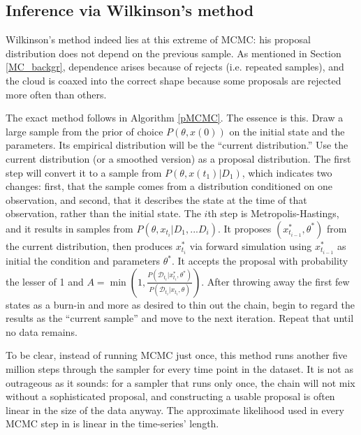 \documentclass{article}
\begin{document}
\subsection{Inference via Wilkinson's method}
Wilkinson's method indeed lies at this extreme of MCMC: his proposal distribution does not depend on the previous sample. As mentioned in Section \ref{MC_backgr}, dependence arises because of rejects (i.e. repeated samples), and the cloud is coaxed into the correct shape because some proposals are rejected more often than others. 

The exact method follows in Algorithm \ref{pMCMC}. The essence is this. Draw a large sample from the prior of choice $P(\theta, x(0))$ on the initial state and the parameters. Its empirical distribution will be the ``current distribution.'' Use the current distribution (or a smoothed version) as a proposal distribution. The first step will convert it to a sample from $P(\theta, x(t_1)|D_1)$, which indicates two changes: first, that the sample comes from a distribution conditioned on one observation, and second, that it describes the state at the time of that observation, rather than the initial state. The $i$th step is Metropolis-Hastings, and it results in samples from $P(\theta, x_{t_i}|D_{1}, ...D_{i})$. It proposes $(x_{t_{i-1}}^*, \theta^*)$ from the current distribution, then produces $x_{t_{i}}^*$ via forward simulation using $x_{t_{i-1}}^*$ as initial the condition and parameters $\theta^*$. It accepts the proposal with probability the lesser of 1 and $A=\min(1, \frac{P(\mathcal{D}_{t_{i}}|x_{t_{i}}^*, \theta^*)}{P(\mathcal{D}_{t_{i}}|x_{t_{i}}, \theta)})$. After throwing away the first few states as a burn-in and more as desired to thin out the chain, begin to regard the results as the ``current sample'' and move to the next iteration. Repeat that until no data remains.

To be clear, instead of running MCMC just once, this method runs another five million steps through the sampler for every time point in the dataset. It is not as outrageous as it sounds: for a sampler that runs only once, the chain will not mix without a sophisticated proposal, and constructing a usable proposal is often linear in the size of the data anyway. The approximate likelihood used in every MCMC step in \cite{golightly2011bayesian} is linear in the time-series' length.
\end{document}
